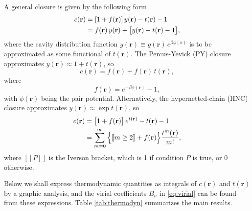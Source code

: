 \documentclass[aip,jcp,reprint,superscriptaddress]{revtex4-1}
\newcommand{\vct}[1]{\mathbf{#1}}
\providecommand{\vr}{} %
\renewcommand{\vr}{\vct{r}}
\newcommand{\llbra}{[\![}
\newcommand{\llket}{]\!]}
\begin{document}
A general closure is given by the following form
%
\begin{align}
  c(\vr)
&= [1 + f(\vr)] \, y(\vr) - t(\vr) - 1
  \notag \\
&= f(\vr) \, y(\vr) + \big[ y(\vr) - t(\vr) - 1 \big],
  \label{eq:closure}
\end{align}
%
where the cavity distribution function $y(\vr) \equiv g(\vr) \, e^{ \beta \phi(\vr) }$
  is to be approximated as some functional of $t(\vr)$.
%
The Percus-Yevick (PY) closure\cite{percusyevick}
  approximates $y(\vr) \approx 1 + t(\vr)$, so
%
\begin{equation}
  c(\vr) = f(\vr) + f(\vr) \, t(\vr),
  \label{eq:py}
\end{equation}
where
\begin{equation}
  f(\vr) = e^{-\beta \phi(\vr)} - 1,
  \label{eq:fbond}
\end{equation}
with $\phi(\vr)$ being the pair potential.
%
Alternatively, the hypernetted-chain (HNC) closure\cite{
morita1958, *morita1959, *morita1960}
  approximates $y(\vr) \approx \exp { t(\vr) }$, so
%
\begin{align}
  c(\vr) &= \big[ 1 + f(\vr) \big] \, e^{t(\vr)} - t(\vr) - 1 \notag \\
         &= \sum_{m=0}^\infty
                \Big\{ \llbra m \ge 2 \llket + f(\vr) \Big\}
                \frac{ t^m(\vr) }{ m! },
  \label{eq:hnc}
\end{align}
%
where $\llbra P \llket$ is the Iverson bracket,
  which is 1 if condition $P$ is true, or 0 otherwise.

Below we shall express thermodynamic quantities
  as integrals of $c(\vr)$ and $t(\vr)$
  by a graphic analysis,
%
and the virial coefficients $B_n$ in \eqref{eq:virial}
  can be found from these expressions.
%
Table \ref{tab:thermodyn}
  summarizes the main results.

\ifdim \columnwidth < 4in
  \newcommand{\tabscale}{1.0}
\else
  \newcommand{\tabscale}{0.85}
\fi
\end{document}
